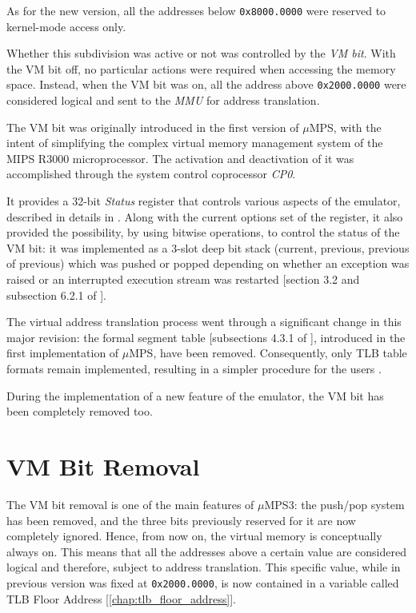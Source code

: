\documentclass[12pt,a4paper,openright,twoside]{report}
\begin{document}
As for the new version, all the addresses below \texttt{0x8000.0000} were reserved to kernel-mode access only.

Whether this subdivision was active or not was controlled by the \textit{VM bit}.
With the VM bit off, no particular actions were required when accessing the memory space.
Instead, when the VM bit was on, all the address above \texttt{0x2000.0000} were considered logical and sent to the \textit{MMU} for address translation.

The VM bit was originally introduced in the first version of $\mu$MPS, with the intent of simplifying the complex virtual memory management system of the MIPS R3000 microprocessor.
The activation and deactivation of it was accomplished through the system control coprocessor \textit{CP0}.

It provides a 32-bit \textit{Status} register that controls various aspects of the emulator, described in details in \cite{pops}.
Along with the current options set of the register, it also provided the possibility, by using bitwise operations, to control the status of the VM bit: it was implemented as a 3-slot deep bit stack (current, previous, previous of previous) which was pushed or popped depending on whether an exception was raised or an interrupted execution stream was restarted [section 3.2 and subsection 6.2.1 of \cite{old_pops}].

The virtual address translation process went through a significant change in this major revision: the formal segment table [subsections 4.3.1 of \cite{old_pops}], introduced in the first implementation of $\mu$MPS, have been removed.
Consequently, only TLB table formats remain implemented, resulting in a simpler procedure for the users \cite{pops}.

During the implementation of a new feature of the emulator, the VM bit has been completely removed too.

\section{VM Bit Removal}
\label{chap:vm_bit_removal}
The VM bit removal is one of the main features of $\mu$MPS3: the push/pop system has been removed, and the three bits previously reserved for it are now completely ignored.
Hence, from now on, the virtual memory is conceptually always on.
This means that all the addresses above a certain value are considered logical and therefore, subject to address translation.
This specific value, while in previous version was fixed at \texttt{0x2000.0000}, is now contained in a variable called TLB Floor Address [\autoref{chap:tlb_floor_address}].
\end{document}
